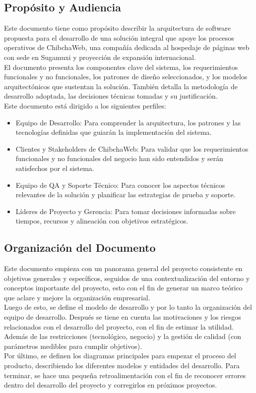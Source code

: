 \subsection{Propósito y Audiencia}
Este documento tiene como propósito describir la arquitectura de software propuesta para el desarrollo de una solución integral que apoye los procesos operativos de ChibchaWeb, una compañía dedicada al hospedaje de páginas web con sede en Sugamuxi y proyección de expansión internacional.\\
El documento presenta los componentes clave del sistema, los requerimientos funcionales y no funcionales, los patrones de diseño seleccionados, y los modelos arquitectónicos que sustentan la solución. También detalla la metodología de desarrollo adoptada, las decisiones técnicas tomadas y su justificación.\\
Este documento está dirigido a los siguientes perfiles:

\begin{itemize}
    \item{Equipo de Desarrollo: Para comprender la arquitectura, los patrones y las tecnologías definidas que guiarán la implementación del sistema.}
    \item{Clientes y Stakeholders de ChibchaWeb: Para validar que los requerimientos funcionales y no funcionales del negocio han sido entendidos y serán satisfechos por el sistema.}
    \item{Equipo de QA y Soporte Técnico: Para conocer los aspectos técnicos relevantes de la solución y planificar las estrategias de prueba y soporte.}
    \item{Líderes de Proyecto y Gerencia: Para tomar decisiones informadas sobre tiempos, recursos y alineación con objetivos estratégicos.}
\end{itemize}

\subsection{Organización del Documento}
Este documento empieza con un panorama general del proyecto consistente en objetivos generales y específicos, seguidos de una contextualización del entorno y conceptos importante del proyecto, esto con el fin de generar un marco teórico que aclare y mejore la organización empresarial.\\
Luego de esto, se define el modelo de desarrollo y por lo tanto la organización del equipo de desarrollo. Después se tiene en cuenta las motivaciones y los riesgos relacionados con el desarrollo del proyecto, con el fin de estimar la utilidad. Además de las restricciones (tecnológico, negocio) y la gestión de calidad (con parámetros medibles para cumplir objetivos).\\
Por último, se definen los diagramas principales para empezar el proceso del producto, describiendo los diferentes modelos y entidades del desarrollo.
Para terminar, se hace una pequeña retroalimentación con el fin de reconocer errores dentro del desarrollo del proyecto y corregirlos en próximos proyectos.

